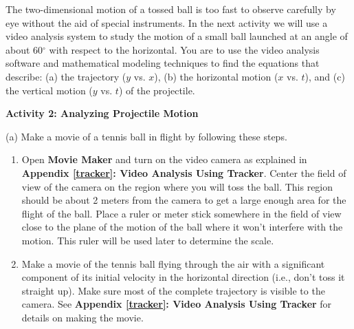 The two-dimensional motion of a tossed ball is too fast to observe carefully
by eye without the aid of special instruments. In the next activity we will
use a video analysis system to study the motion of a small ball launched at
an angle of about 60\( ^{\circ } \) with respect to the horizontal. You are
to use the video analysis software and mathematical modeling techniques to find
the equations that describe: (a) the trajectory ($y$ vs. $x$), 
(b) the horizontal
motion ($x$ vs. $t$), and (c) the vertical motion ($y$ vs. 
$t$) of the projectile.

\newpage
\textbf{Activity 2: Analyzing Projectile Motion} 

(a) Make a movie of a tennis ball in flight by following these steps. 

\begin{enumerate}
\item Open \textbf{Movie Maker} and turn on the video camera as explained in \textbf{Appendix \ref{tracker}: Video Analysis Using Tracker}. Center the field of view of the camera on the region where you will toss the ball. This region should be about 2 meters from the camera to
get a large enough area for the flight of the ball. Place a ruler or meter stick
somewhere in the field of view close to the plane of the motion of the ball
where it won't interfere with the motion. This ruler will be used later to determine the scale. 
\item Make a movie of the tennis ball flying through the air with a significant component
of its initial velocity in the horizontal direction (i.e., don't toss it straight
up). Make sure most of the complete trajectory is visible to the camera. See
\textbf{Appendix \ref{tracker}: Video Analysis Using Tracker} for details on making the movie. 

\end{enumerate}
